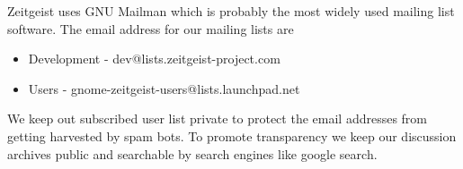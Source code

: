 Zeitgeist uses GNU Mailman which is probably the most widely used mailing list software. The email address for our 
mailing lists are
\begin{itemize}
\item Development - dev@lists.zeitgeist-project.com
\item Users - gnome-zeitgeist-users@lists.launchpad.net
\end{itemize}

We keep out subscribed user list private to protect the email addresses from getting harvested by spam bots. To promote 
transparency we keep our discussion archives public and searchable by search engines like google search.